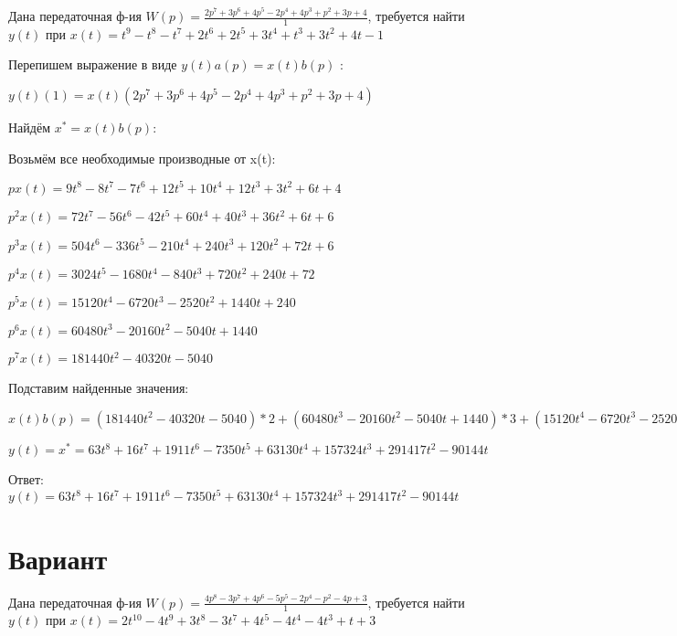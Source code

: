 \documentclass{article}
\begin{document}
{{{{{Дана передаточная ф-ия $W(p)=\frac{2p^{7}+3p^{6}+4p^{5}-2p^{4}+4p^{3}+p^{2}+3p+4}{1}$, требуется найти $y(t)$ при $x(t)=t^{9}-t^{8}-t^{7}+2t^{6}+2t^{5}+3t^{4}+t^{3}+3t^{2}+4t-1$

Перепишем выражение в виде $y(t)a(p)=x(t)b(p)$ :

$y(t)(1)=x(t)(2p^{7}+3p^{6}+4p^{5}-2p^{4}+4p^{3}+p^{2}+3p+4)$

Найдём $x^*=x(t)b(p)$:

Возьмём все необходимые производные от x(t):

$px(t)=9t^{8}-8t^{7}-7t^{6}+12t^{5}+10t^{4}+12t^{3}+3t^{2}+6t+4$

$p^2x(t)=72t^{7}-56t^{6}-42t^{5}+60t^{4}+40t^{3}+36t^{2}+6t+6$

$p^3x(t)=504t^{6}-336t^{5}-210t^{4}+240t^{3}+120t^{2}+72t+6$

$p^4x(t)=3024t^{5}-1680t^{4}-840t^{3}+720t^{2}+240t+72$

$p^5x(t)=15120t^{4}-6720t^{3}-2520t^{2}+1440t+240$

$p^6x(t)=60480t^{3}-20160t^{2}-5040t+1440$

$p^7x(t)=181440t^{2}-40320t-5040$

Подставим найденные значения:

$x(t)b(p) = (181440t^{2}-40320t-5040)*2+(60480t^{3}-20160t^{2}-5040t+1440)*3+(15120t^{4}-6720t^{3}-2520t^{2}+1440t+240)*4+(3024t^{5}-1680t^{4}-840t^{3}+720t^{2}+240t+72)*(-2)+(504t^{6}-336t^{5}-210t^{4}+240t^{3}+120t^{2}+72t+6)*4+(72t^{7}-56t^{6}-42t^{5}+60t^{4}+40t^{3}+36t^{2}+6t+6)*1+(9t^{8}-8t^{7}-7t^{6}+12t^{5}+10t^{4}+12t^{3}+3t^{2}+6t+4)*3+(9t^{8}-8t^{7}-7t^{6}+12t^{5}+10t^{4}+12t^{3}+3t^{2}+6t+4)*4=63t^{8}+16t^{7}+1911t^{6}-7350t^{5}+63130t^{4}+157324t^{3}+291417t^{2}-90144t$





$y(t)=x^*=63t^{8}+16t^{7}+1911t^{6}-7350t^{5}+63130t^{4}+157324t^{3}+291417t^{2}-90144t$

Ответ: $y(t) = 63t^{8}+16t^{7}+1911t^{6}-7350t^{5}+63130t^{4}+157324t^{3}+291417t^{2}-90144t$

\section{Вариант}

Дана передаточная ф-ия $W(p)=\frac{4p^{8}-3p^{7}+4p^{6}-5p^{5}-2p^{4}-p^{2}-4p+3}{1}$, требуется найти $y(t)$ при $x(t)=2t^{10}-4t^{9}+3t^{8}-3t^{7}+4t^{5}-4t^{4}-4t^{3}+t+3$

}}}}}
\end{document}
